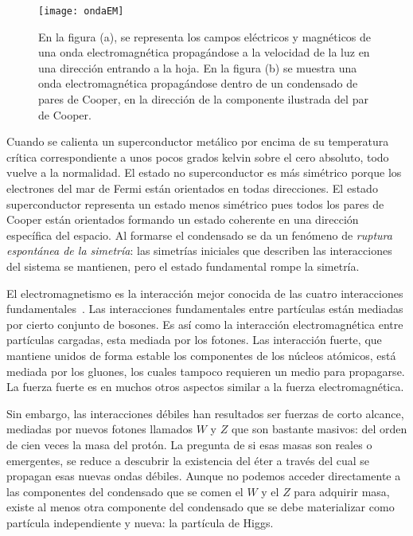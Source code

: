 \begin{figure}
  \centering
  \texttt{[image: ondaEM]}
  \caption{En la figura (a), se representa los campos eléctricos y magnéticos de una onda electromagnética propagándose a la velocidad de la luz en una dirección entrando a la hoja. En  la figura (b) se muestra una onda electromagnética propagándose dentro de un condensado de pares de Cooper, en la dirección de la componente ilustrada del par de Cooper.}
  \label{fig:2}
\end{figure}


Cuando se calienta un superconductor metálico por encima de su temperatura crítica correspondiente a unos pocos grados kelvin sobre el cero absoluto, todo vuelve a la normalidad. El estado no superconductor es más simétrico porque los electrones del mar de Fermi están orientados en todas direcciones. El estado superconductor representa un estado menos simétrico pues todos los pares de Cooper están orientados formando un estado coherente en una dirección específica del espacio. Al formarse el condensado se da un fenómeno de \emph{ruptura espontánea de la simetría}: las simetrías iniciales que describen las interacciones del sistema se mantienen, pero el estado fundamental rompe la simetría.  

El electromagnetismo es la interacción mejor conocida de las cuatro interacciones fundamentales~\cite{pi}. Las interacciones fundamentales  entre partículas están mediadas por cierto conjunto de bosones.  Es así como la interacción electromagnética entre partículas cargadas, esta mediada por los fotones. Las interacción fuerte, que mantiene unidos de forma estable los componentes de los núcleos atómicos, está mediada por los gluones, los cuales tampoco requieren un medio para propagarse. La fuerza fuerte es en muchos otros aspectos similar a la fuerza electromagnética. 

Sin embargo, las interacciones débiles han resultados ser fuerzas de corto alcance, mediadas por nuevos fotones llamados $W$ y $Z$ que son bastante masivos: del orden de cien veces la masa del protón. La pregunta de si esas masas son reales o emergentes, se reduce a descubrir la existencia del éter a través del cual se propagan esas nuevas ondas débiles. Aunque no podemos acceder directamente a las componentes del condensado que se comen el $W$ y el $Z$ para adquirir masa, existe al menos otra componente del condensado que se debe materializar como partícula independiente y nueva: la partícula de Higgs. 

